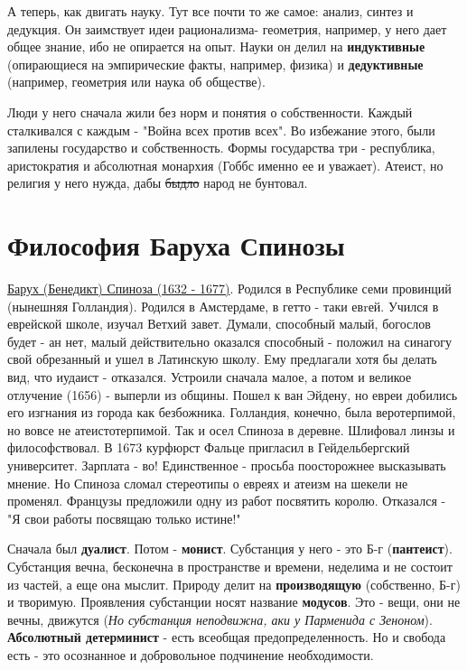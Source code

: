 А теперь, как двигать науку. Тут все почти то же самое: анализ, синтез и дедукция. Он заимствует идеи рационализма- геометрия, например, у него дает общее знание, ибо не опирается на опыт. Науки он делил на \textbf{индуктивные} (опирающиеся на эмпирические факты, например, физика) и \textbf{дедуктивные} (например, геометрия или наука об обществе).

Люди у него сначала жили без норм и понятия о собственности. Каждый сталкивался с каждым - "Война всех против всех". Во избежание этого, были запилены государство и собственность. Формы государства три - республика, аристократия и абсолютная монархия (Гоббс именно ее и уважает). Атеист, но религия у него нужда, дабы \sout{быдло} народ не бунтовал.

\section{Философия Баруха Спинозы}
\underline{Барух (Бенедикт) Спиноза (1632 - 1677)}. Родился в Республике семи провинций (нынешняя Голландия). Родился в Амстердаме, в гетто - таки евrей. Учился в еврейской школе, изучал Ветхий завет. Думали, способный малый, богослов будет - ан нет, малый действительно оказался способный - положил на синагогу свой обрезанный и ушел в Латинскую школу. Ему предлагали хотя бы делать вид, что иудаист - отказался. Устроили сначала малое, а потом и великое отлучение (1656) - выперли из общины. Пошел к ван Эйдену, но евреи добились его изгнания из города как безбожника. Голландия, конечно, была веротерпимой, но вовсе не атеистотерпимой. Так и осел Спиноза в деревне. Шлифовал линзы и философствовал. В 1673 курфюрст Фальце пригласил в Гейдельбергский университет. Зарплата - во! Единственное - просьба поосторожнее высказывать мнение. Но Спиноза сломал стереотипы о евреях и атеизм на шекели не променял. Французы предложили одну из работ посвятить королю. Отказался - "Я свои работы посвящаю только истине!"

Сначала был \textbf{дуалист}. Потом - \textbf{монист}. Субстанция у него  - это Б-г (\textbf{пантеист}). Субстанция вечна, бесконечна в пространстве и времени, неделима и не состоит из частей, а еще она мыслит. Природу делит на \textbf{производящую} (собственно, Б-г) и творимую. Проявления субстанции носят название \textbf{модусов}. Это - вещи, они не вечны, движутся (\textit{Но субстанция неподвижна, аки у Парменида с Зеноном}). \textbf{Абсолютный детерминист} - есть всеобщая предопределенность. Но и свобода есть - это осознанное и добровольное подчинение необходимости.


